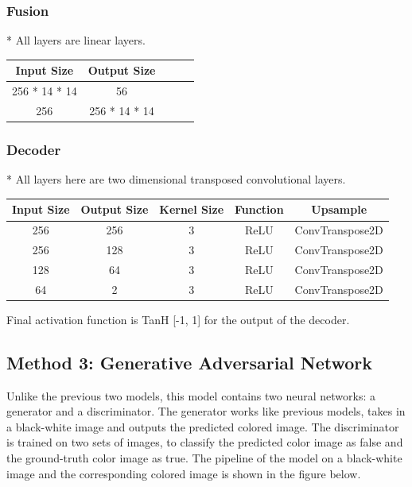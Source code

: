 \documentclass{article}
\begin{document}
\subsubsection{Fusion}

* All layers are linear layers.

\begin{center}
\begin{tabular}{ |c|c|c|c|c| } 
\hline
Input Size & Output Size  \\
\hline
256 * 14 * 14 & 56 \\ 
256 & 256 * 14 * 14 \\ 

\hline
\end{tabular}
\end{center}

\subsubsection{Decoder}

* All layers here are two dimensional transposed convolutional layers.

\begin{center}
\begin{tabular}{ |c|c|c|c|c| } 
\hline
Input Size & Output Size & Kernel Size & Function & Upsample \\
\hline
256 & 256 & 3 & ReLU & ConvTranspose2D \\ 
256 & 128 & 3 & ReLU & ConvTranspose2D \\ 
128 & 64 & 3 & ReLU &  ConvTranspose2D \\ 
64 & 2 & 3 & ReLU & ConvTranspose2D \\ 
\hline
\end{tabular}
\end{center}

Final activation function is TanH [-1, 1] for the output of the decoder.


\subsection{Method 3: Generative Adversarial Network}
Unlike the previous two models, this model contains two neural networks: a generator and a discriminator. 
The generator works like previous models, takes in a black-white image and outputs the predicted colored image.
The discriminator is trained on two sets of images, to classify the predicted color image as false and the ground-truth color image as true. 
The pipeline of the model on a black-white image and the corresponding colored image is shown in the figure below.
\end{document}
